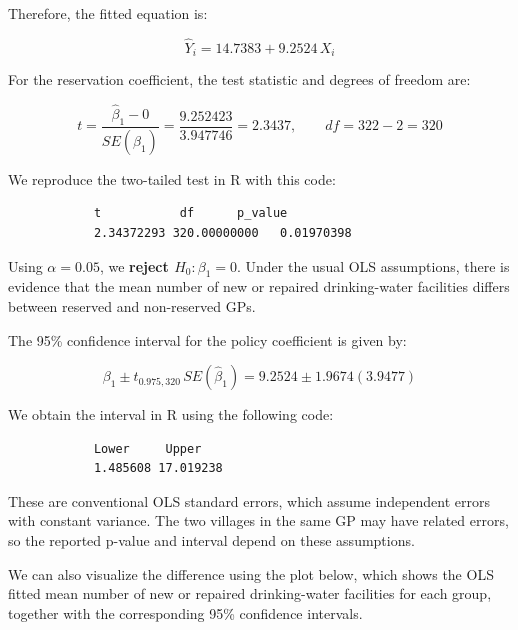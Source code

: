 \documentclass[12pt,letterpaper]{article}
\begin{document}
\begin{enumerate}
		\vspace{.25cm}
		
		Therefore, the fitted equation is:
		
		$$\widehat{Y}_i=14.7383+9.2524\,X_i$$
		
		For the reservation coefficient, the test statistic and degrees of freedom are:
		
		$$t=\frac{\hat\beta_1-0}{SE(\hat\beta_1)}=\frac{9.252423}{3.947746}=2.3437,\qquad df=322-2=320$$
		
		
		We reproduce the two-tailed test in R with this code:
		
		
		
		\begin{verbatim}
			t           df      p_value
			2.34372293 320.00000000   0.01970398
		\end{verbatim}
		
		\vspace{.25cm}
		
		Using $\alpha=0.05$, we \textbf{reject $H_0:\beta_1=0$}. Under the usual OLS assumptions, there is evidence that the mean number of new or repaired drinking-water facilities differs between reserved and non-reserved GPs.
		
		The 95\% confidence interval for the policy coefficient is given by:
		
		$$\beta_1\pm t_{0.975,320}\,SE(\hat\beta_1)=9.2524\pm1.9674(3.9477)$$
		
		We obtain the interval in R using the following code:
		
		
		
		\begin{verbatim}
			Lower     Upper 
			1.485608 17.019238 
		\end{verbatim}
		
		\vspace{.25cm}
		
		These are conventional OLS standard errors, which assume independent errors with constant variance. The two villages in the same GP may have related errors, so the reported p-value and interval depend on these assumptions.
		
		We can also visualize the difference using the plot below, which shows the OLS fitted mean number of new or repaired drinking-water facilities for each group, together with the corresponding 95\% confidence intervals.
		

\end{enumerate}
\end{document}
